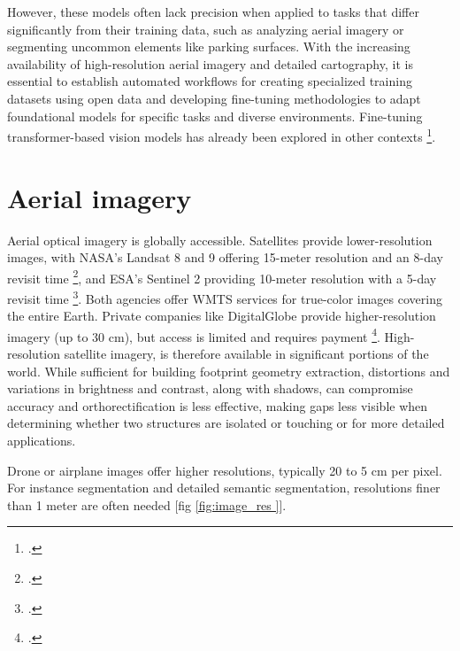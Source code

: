 \begin{refsection}
However, these models often lack precision when applied to tasks that differ significantly from their training data, such as analyzing aerial imagery or segmenting uncommon elements like parking surfaces. With the increasing availability of high-resolution aerial imagery and detailed cartography, it is essential to establish automated workflows for creating specialized training datasets using open data and developing fine-tuning methodologies to adapt foundational models for specific tasks and diverse environments. Fine-tuning transformer-based vision models has already been explored in other contexts \footcite{sandler_fine-tuning_2022}.\\ 

\renewcommand{\sectionnametext}{Aerial imagery}
\renewcommand{\headingtextR}{\thesection. \sectionnametext}
\section{\sectionnametext}

Aerial optical imagery is globally accessible. Satellites provide lower-resolution images, with NASA's Landsat 8 and 9 offering 15-meter resolution and an 8-day revisit time \footcite{noauthor_usgs_nodate}, and ESA's Sentinel 2 providing 10-meter resolution with a 5-day revisit time \footcite{noauthor_copernicus_nodate}. Both agencies offer WMTS services for true-color images covering the entire Earth. Private companies like DigitalGlobe provide higher-resolution imagery (up to 30 cm), but access is limited and requires payment \footcite{digitalglobe_worldview-3_nodate}. High-resolution satellite imagery, is therefore available in significant portions of the world. While sufficient for building footprint geometry extraction, distortions and variations in brightness and contrast, along with shadows, can compromise accuracy and orthorectification is less effective, making gaps less visible when determining whether two structures are isolated or touching or for more detailed applications.

Drone or airplane images offer higher resolutions, typically 20 to 5 cm per pixel. For instance segmentation and detailed semantic segmentation, resolutions finer than 1 meter are often needed [fig \ref{fig:image_res
}]. 


\end{refsection}
